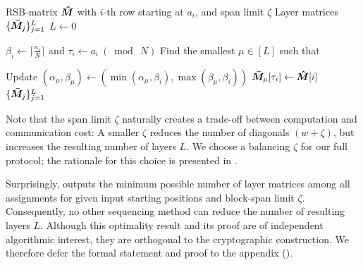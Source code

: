 \begin{algorithm}[h]
\caption{\textsf{RSB-OKVS.Sequencing}}\label{alg:sequencing}
\begin{algorithmic}[1]
  \Input RSB\mbox{-}matrix $\bm{\hat{M}}$ with $i$-th row starting at $a_i$, and span limit $\zeta$
  \Output Layer matrices $\{\bm{\bar{M}}_j\}_{j=1}^{L}$
\State $L \leftarrow 0$ 

\State $\beta_i \leftarrow \lceil\frac{a_i}{N}\rceil$ and $\tau_i \leftarrow a_i~(\bmod~N)$
  \State Find the smallest $\mu \in [L]$ such that 
     
    \State Update $(\alpha_\mu,\beta_\mu) \leftarrow (\min(\alpha_\mu,\beta_i),\max(\beta_\mu,\beta_i))$
  \Else {}
  \EndIf
  \State $\bm{\bar{M}}_{\mu}[\tau_i] \gets \bm{\hat{M}}[i]$
\EndFor  
  \State \Return $\{\bm{\bar{M}}_j\}_{j=1}^{L}$
\end{algorithmic}
\end{algorithm}



Note that the span limit $\zeta$ naturally creates a trade-off between computation and communication cost: A smaller $\zeta$ reduces the number of diagonals $(w + \zeta)$, but increases the resulting number of layers $L$. We choose a balancing $\zeta$ for our full protocol; the rationale for this choice is presented in .

Surprisingly,  outputs the minimum possible number of layer matrices among all assignments for given input starting positions and block-span limit $\zeta$. Consequently, no other sequencing method can reduce the number of resulting layers $L$. Although this optimality result and its proof are of independent algorithmic interest, they are orthogonal to the cryptographic construction. We therefore defer the formal statement and proof to the appendix ().

